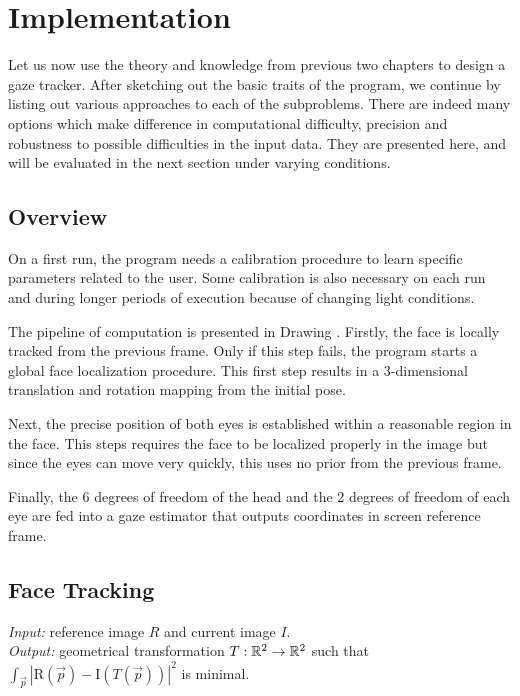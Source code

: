 \chapter{Implementation}

Let us now use the theory and knowledge from previous two chapters to design a gaze tracker.
After sketching out the basic traits of the program, we continue by listing out various approaches to each of the subproblems.
There are indeed many options which make difference in computational difficulty, precision and robustness to possible difficulties in the input data.
They are presented here, and will be evaluated in the next section under varying conditions.

\section{Overview}

On a first run, the program needs a calibration procedure to learn specific parameters related to the user.
Some calibration is also necessary on each run and during longer periods of execution because of changing light conditions.

The pipeline of computation is presented in Drawing .
Firstly, the face is locally tracked from the previous frame.
Only if this step fails, the program starts a global face localization procedure.
This first step results in a 3-dimensional translation and rotation mapping from the initial pose.

Next, the precise position of both eyes is established within a reasonable region in the face.
This steps requires the face to be localized properly in the image but since the eyes can move very quickly, this uses no prior from the previous frame.

Finally, the 6 degrees of freedom of the head and the 2 degrees of freedom of each eye are fed into a gaze estimator that outputs coordinates in screen reference frame.

\section{Face Tracking}

\textit{Input:} reference image $R$ and current image $I$.\\
\textit{Output:} geometrical transformation $T: \mathbb{R}^2 \to \mathbb{R}^2$ such that $\int_{\vec p} |\textrm{R}(\vec p) - \textrm{I}(T(\vec p))|^2$ is minimal.\\

